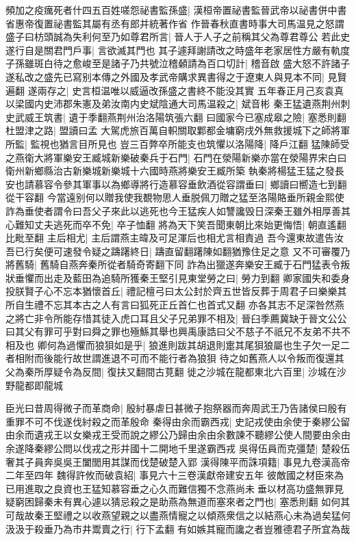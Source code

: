 頻加之疫癘死者什四五百姓嗟怨祕書監孫盛|{
	漢桓帝置祕書監晉武帝以祕書併中書省惠帝復置祕書監其屬有丞有郎并統著作省}
作晉春秋直書時事大司馬温見之怒謂盛子曰枋頭誠為失利何至乃如尊君所言|{
	晉人于人子之前稱其父為尊君尊公}
若此史遂行自是關君門戶事|{
	言欲滅其門也}
其子遽拜謝請改之時盛年老家居性方嚴有軌度子孫雖斑白待之愈峻至是諸子乃共號泣稽顙請為百口切計|{
	稽音啟}
盛大怒不許諸子遂私改之盛先已寫别本傳之外國及孝武帝購求異書得之于遼東人與見本不同|{
	見賢遍翻}
遂兩存之|{
	史言桓温唯以威逼改孫盛之書終不能没其實}
五年春正月己亥袁真以梁國内史沛郡朱憲及弟汝南内史斌陰通大司馬温殺之|{
	斌音彬}
秦王猛遺燕荆州刺史武威王筑書|{
	遺于季翻燕荆州治洛陽筑張六翻}
曰國家今已塞成皋之險|{
	塞悉則翻}
杜盟津之路|{
	盟讀曰孟}
大駕虎旅百萬自軹關取鄴都金墉窮戌外無救援城下之師將軍所監|{
	監視也猶言目所見也}
豈三百弊卒所能支也筑懼以洛陽降|{
	降戶江翻}
猛陳師受之燕衛大將軍樂安王臧城新樂破秦兵于石門|{
	石門在滎陽新樂亦當在滎陽界宋白曰衛州新鄉縣治古新樂城新樂城十六國時燕將樂安王臧所築}
執秦將楊猛王猛之發長安也請慕容令參其軍事以為鄉導將行造慕容垂飲酒從容謂垂曰|{
	鄉讀曰嚮造七到翻從干容翻}
今當遠别何以贈我使我覩物思人垂脱佩刀贈之猛至洛陽賂垂所親金熙使詐為垂使者謂令曰吾父子來此以逃死也今王猛疾人如讐讒毁日深秦王雖外相厚善其心難知丈夫逃死而卒不免|{
	卒子恤翻}
將為天下笑吾聞東朝比來始更悔悟|{
	朝直遙翻比毗至翻}
主后相尤|{
	主后謂燕主暐及可足渾后也相尤言相責過}
吾今還東故遣告汝吾已行矣便可速發令疑之躊躇終日|{
	躊直留翻躇陳如翻猶豫住足之意}
又不可審覆乃將舊騎|{
	舊騎自燕奔秦所從者騎奇寄翻下同}
詐為出獵遂奔樂安王臧于石門猛表令叛狀垂懼而出走及藍田為追騎所獲秦王堅引見東堂勞之曰|{
	勞力到翻}
卿家國失和委身投朕賢子心不忘本猶懷首丘|{
	禮記檀弓曰太公封於齊五世皆反葬于周君子曰樂樂其所自生禮不忘其本古之人有言曰狐死正丘首仁也首式又翻}
亦各其志不足深咎然燕之將亡非令所能存惜其徒入虎口耳且父子兄弟罪不相及|{
	晉臼季薦冀缺于晉文公公曰其父有罪可乎對曰舜之罪也殛鯀其舉也興禹康誥曰父不慈子不祇兄不友弟不共不相及也}
卿何為過懼而狼狽如是乎|{
	狼進則跋其胡退則疐其尾狽狼屬也生子欠一足二者相附而後能行故世謂進退不可而不能行者為狼狽}
待之如舊燕人以令叛而復還其父為秦所厚疑令為反間|{
	復扶又翻間古莧翻}
徙之沙城在龍都東北六百里|{
	沙城在沙野龍都即龍城}


臣光曰昔周得微子而革商命|{
	殷紂暴虐日甚微子抱祭器而奔周武王乃告諸侯曰殷有重罪不可不伐遂伐紂殺之而革殷命}
秦得由余而霸西戎|{
	史記戎使由余使于秦繆公留由余而遺戎王以女樂戎王受而說之繆公乃歸由余由余數諫不聽繆公使人間要由余由余遂降秦繆公問以伐戎之形并國十二開地千里遂霸西戎}
吳得伍員而克彊楚|{
	楚殺伍奢其子員奔吳吳王闔閭用其謀而伐楚破楚入郢}
漢得陳平而誅項籍|{
	事見九卷漢高帝二年至四年}
魏得許攸而破袁紹|{
	事見六十三卷漢獻帝建安五年}
彼敵國之材臣來為已用進取之良資也王猛知慕容垂之心久而難信獨不念燕尚未垂以材高功盛無罪見疑窮困歸秦未有異心遽以猜忌殺之是助燕為無道而塞來者之門也|{
	塞悉則翻}
如何其可哉故秦王堅禮之以收燕望親之以盡燕情寵之以傾燕衆信之以結燕心未為過矣猛何汲汲于殺垂乃為市井鬻賣之行|{
	行下孟翻}
有如嫉其寵而讒之者豈雅德君子所宜為哉

